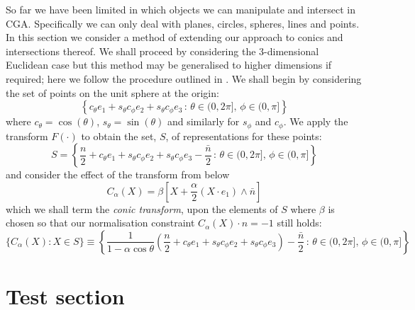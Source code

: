 So far we have been limited in which objects we can manipulate and intersect
in CGA. Specifically we can only deal with planes, circles, spheres, lines and
points. In this section we consider a method of extending our approach to
conics and intersections thereof. We shall proceed by considering the 
3-dimensional Euclidean case but this method may be generalised to higher
dimensions if required; here we follow the procedure outlined in
\cite{anthonyChina}.
We shall begin by considering the set of points on the unit sphere at the 
origin:
\[
\left\{ c_\theta e_1 + s_\theta c_\phi e_2 + s_\theta c_\phi e_3\,:\,
	\theta \in (0,2\pi],\,\phi \in (0,\pi] \right\}
\]
where $c_\theta = \cos(\theta)$, $s_\theta = \sin(\theta)$ and similarly
for $s_\phi$ and $c_\phi$. We apply the transform $F(\cdot)$ to
obtain the set, $S$, of representations for these points:
\[
S = \left\{ \frac{n}{2} + c_\theta e_1 + s_\theta c_\phi e_2
+ s_\theta c_\phi e_3 -
    \frac{\bar{n}}{2} \,:\,
	\theta \in (0,2\pi],\,\phi \in (0,\pi] \right\}
\]
and consider the effect of the transform from \cite{anthonyChina} below 
\[
C_\alpha(X) = \beta \left[ X + \frac{\alpha}{2} (X \cdot e_1) \wedge \bar{n} \right]
\]
which we shall term the \emph{conic transform}, upon the elements of $S$ 
where $\beta$ is chosen so that our normalisation constraint
$C_\alpha(X) \cdot n = -1$ still holds:
\[
\{ C_\alpha(X) : X \in S \} \equiv \left\{ \frac{1}{1 - \alpha \cos \theta} \left(
	\frac{n}{2} + c_\theta e_1 + s_\theta c_\phi e_2 
              + s_\theta c_\phi e_3 \right) -
    \frac{\bar{n}}{2} \,:\,
	\theta \in (0,2\pi],\,\phi \in (0,\pi] \right\}
\]

\section{Test section}


